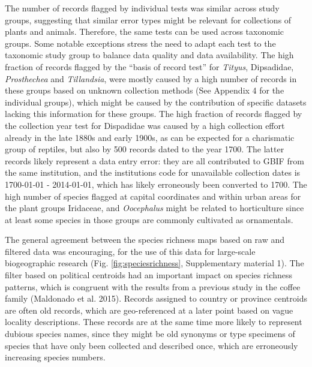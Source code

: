 \documentclass[fleqn,10pt,lineno]{wlpeerj} %
\begin{document}
The number of records flagged by individual tests was similar across study groups, suggesting that similar error types might be relevant for collections of plants and animals. Therefore, the same tests can be used across taxonomic groups. Some notable exceptions stress the need to adapt each test to the taxonomic study group to balance data quality and data availability. The high fraction of records flagged by the ``basis of record test'' for \emph{Tityus}, Dipsadidae, \emph{Prosthechea} and \emph{Tillandsia}, were mostly caused by a high number of records in these groups based on unknown collection methods (See Appendix 4 for the individual groups), which might be caused by the contribution of specific datasets lacking this information for these groups. The high fraction of records flagged by the collection year test for Dispadidae was caused by a high collection effort already in the late 1880s and early 1900s, as can be expected for a charismatic group of reptiles, but also by 500 records dated to the year 1700. The latter records likely represent a data entry error: they are all contributed to GBIF from the same institution, and the institutions code for unavailable collection dates is 1700-01-01 - 2014-01-01, which has likely erroneously been converted to 1700. The high number of species flagged at capital coordinates and within urban areas for the plant groups Iridaceae, and \emph{Oocephalus} might be related to horticulture since at least some species in those groups are commonly cultivated as ornamentals.

The general agreement between the species richness maps based on raw and filtered data was encouraging, for the use of this data for large-scale biogeographic research (Fig. \ref{fig:speciesrichness}, Supplementary material 1). The filter based on political centroids had an important impact on species richness patterns, which is congruent with the results from a previous study in the coffee family (Maldonado et al. 2015). Records assigned to country or province centroids are often old records, which are geo-referenced at a later point based on vague locality descriptions. These records are at the same time more likely to represent dubious species names, since they might be old synonyms or type specimens of species that have only been collected and described once, which are erroneously increasing species numbers.
\end{document}
